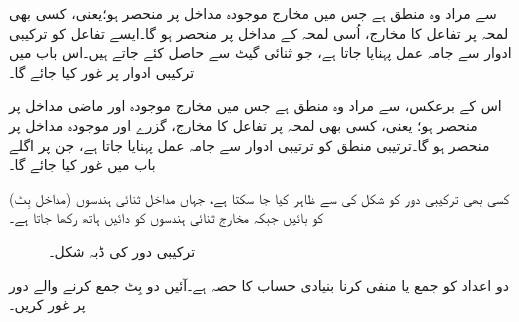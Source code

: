  سے مراد وہ منطق ہے جس میں مخارج    موجودہ مداخل پر   منحصر ہو؛یعنی، 
 کسی بھی لمحہ پر   تفاعل کا مخارج،  اُسی لمحہ  کے مداخل پر منحصر ہو گا۔ایسے  تفاعل کو ترکیبی ادوار  سے جامہ عمل  پہنایا جاتا ہے، جو  ثنائی گیٹ سے حاصل کئے جاتے ہیں۔اس باب میں ترکیبی ادوار پر غور کیا جائے گا۔

اس کے برعکس،   سے مراد وہ منطق ہے جس میں مخارج موجودہ اور ماضی  مداخل پر  منحصر ہو؛ یعنی،  کسی بھی لمحہ پر تفاعل کا مخارج،  گزرے  اور موجودہ   مداخل پر منحصر ہو گا۔ترتیبی منطق کو  ترتیبی  ادوار سے جامہ عمل  پہنایا جاتا ہے، جن  پر اگلے باب میں غور کیا جائے گا۔

کسی بھی ترکیبی دور کو شکل  کی    سے ظاہر کیا جا سکتا ہے، جہاں مداخل ثنائی ہندسوں (مداخل بِٹ)  کو  بائیں جبکہ مخارج ثنائی ہندسوں کو دائیں ہاتھ رکھا جاتا ہے۔
\begin{figure}
\centering
{}
\caption{ترکیبی دور کی ڈبہ  شکل۔}
\label{شکل_ترکیبی_ڈبہ_دور}
\end{figure}
دو اعداد کو جمع یا منفی کرنا بنیادی حساب کا حصہ ہے۔آئیں دو بِٹ جمع کرنے والے دور پر غور کریں۔

